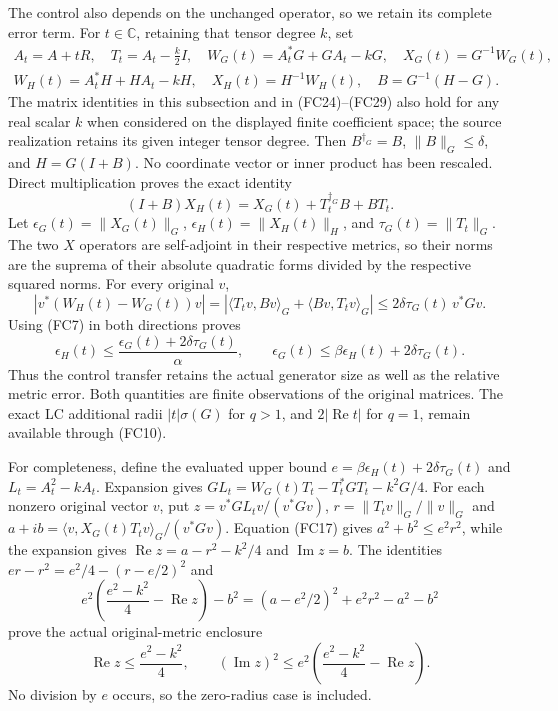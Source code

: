 The control also depends on the unchanged operator, so we retain its
complete error term. For $t\in\mathbb C$, retaining that tensor degree
$k$, set
\[
\begin{gathered}
 A_t=A+tR,\quad T_t=A_t-\tfrac k2I,\quad
 W_G(t)=A_t^*G+GA_t-kG,\quad X_G(t)=G^{-1}W_G(t),\\
 W_H(t)=A_t^*H+HA_t-kH,\quad X_H(t)=H^{-1}W_H(t),\quad
 B=G^{-1}(H-G).
\end{gathered}\tag{FC14}
\]
The matrix identities in this subsection and in (FC24)--(FC29)
also hold for any real scalar $k$ when considered on the displayed
finite coefficient space; the source realization retains its given
integer tensor degree.
Then $B^{\dagger_G}=B$, $\|B\|_G\le\delta$, and $H=G(I+B)$.
No coordinate vector or inner product has been rescaled. Direct
multiplication proves the exact identity
\[
 (I+B)X_H(t)=X_G(t)+T_t^{\dagger_G}B+BT_t.
 \tag{FC15}
\]
Let $\epsilon_G(t)=\|X_G(t)\|_G$, $\epsilon_H(t)=\|X_H(t)\|_H$,
and $\tau_G(t)=\|T_t\|_G$. The two $X$ operators are self-adjoint
in their respective metrics, so their norms are the suprema of their
absolute quadratic forms divided by the respective squared norms.
For every original $v$,
\[
 |v^*(W_H(t)-W_G(t))v|
 =|\langle T_tv,Bv\rangle_G+\langle Bv,T_tv\rangle_G|
 \le2\delta\tau_G(t)\,v^*Gv.
 \tag{FC16}
\]
Using (FC7) in both directions proves
\[
 \boxed{\epsilon_H(t)\le
  \frac{\epsilon_G(t)+2\delta\tau_G(t)}{\alpha},\qquad
 \epsilon_G(t)\le\beta\epsilon_H(t)+2\delta\tau_G(t).}
 \tag{FC17}
\]
Thus the control transfer retains the actual generator size as well as
the relative metric error. Both quantities are finite observations of
the original matrices. The exact LC additional radii
$|t|\sigma(G)$ for $q>1$, and $2|\operatorname{Re}t|$ for $q=1$,
remain available through (FC10).

For completeness, define the evaluated upper bound
$e=\beta\epsilon_H(t)+2\delta\tau_G(t)$ and $L_t=A_t^2-kA_t$.
Expansion gives $GL_t=W_G(t)T_t-T_t^*GT_t-k^2G/4$.
For each nonzero original vector $v$, put
$z=v^*GL_tv/(v^*Gv)$, $r=\|T_tv\|_G/\|v\|_G$ and
$a+ib=\langle v,X_G(t)T_tv\rangle_G/(v^*Gv)$.
Equation (FC17) gives $a^2+b^2\le e^2r^2$, while the expansion gives
$\operatorname{Re}z=a-r^2-k^2/4$ and $\operatorname{Im}z=b$.
The identities $er-r^2=e^2/4-(r-e/2)^2$ and
\[
 e^2\left(\frac{e^2-k^2}{4}-\operatorname{Re}z\right)-b^2
 =(a-e^2/2)^2+e^2r^2-a^2-b^2
\]
prove the actual original-metric enclosure
\[
 \operatorname{Re}z\le\frac{e^2-k^2}{4},\qquad
 (\operatorname{Im}z)^2\le e^2
       \left(\frac{e^2-k^2}{4}-\operatorname{Re}z\right).
 \tag{FC18}
\]
No division by $e$ occurs, so the zero-radius case is included.


